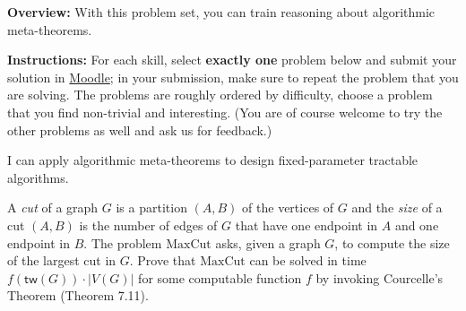 \documentclass{uebung_cs}
\begin{document}
  
\textbf{Overview:} With this problem set, you can train reasoning about algorithmic meta-theorems.

\textbf{Instructions:} For each skill, select \textbf{exactly one} problem below and submit your solution in \href{https://moodle.studiumdigitale.uni-frankfurt.de/moodle/course/view.php?id=6259}{Moodle}; in your submission, make sure to repeat the problem that you are solving.
The problems are roughly ordered by difficulty, choose a problem that you find non-trivial and interesting. (You are of course welcome to try the other problems as well and ask us for feedback.)



\begin{skill}
  I can apply algorithmic meta-theorems to design fixed-parameter tractable algorithms.
\end{skill}

\begin{exercise}
  A \emph{cut} of a graph $G$ is a partition $(A,B)$ of the vertices of $G$ and the \emph{size} of a cut $(A,B)$ is the number of edges of $G$ that have one endpoint in $A$ and one endpoint in $B$. The problem $\mathrm{MaxCut}$ asks, given a graph $G$, to compute the size of the largest cut in $G$. Prove that $\mathrm{MaxCut}$ can be solved in time $f(\mathsf{tw}(G)) \cdot |V(G)|$ for some computable function $f$ by invoking Courcelle's Theorem (Theorem 7.11).
  \end{exercise}
  
\end{document}

